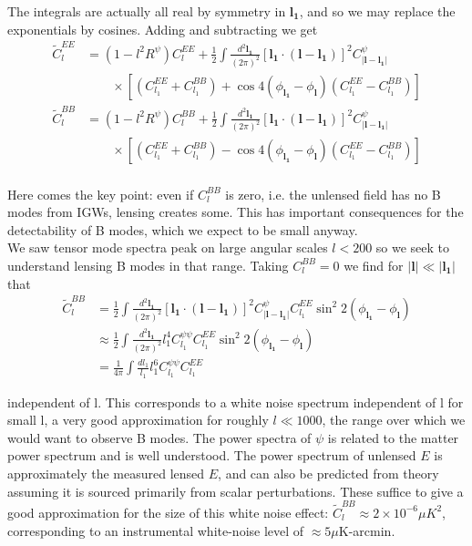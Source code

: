 \documentclass[a4paper,10pt]{article}
\renewcommand{\v}[1]{\mathbf{#1}}
\newcommand{\half}{\frac{1}{2}}
\newcommand{\finttwo}[1]{\int \frac{d^2 \v{#1}}{(2\pi)^2}}
\begin{document}
The integrals are actually all real by symmetry in $\v{l_1}$, and so we may replace the exponentials by cosines. Adding and subtracting we get
\begin{equation}\begin{split}
\tilde{C}_l^{EE} &= (1-l^2R^\psi)C_l^{EE}+\half \finttwo{l_1}[ \v{l_1}\cdot(\v{l}-\v{l_1})]^2 C^\psi_{|\v{l}-\v{l_1}|}\\
&\qquad \times [(C_{l_1}^{EE}+C_{l_1}^{BB})+\cos{4(\phi_\v{l_1}-\phi_\v{l})}(C_{l_1}^{EE}-C_{l_1}^{BB})]\\
\tilde{C}_l^{BB} &= (1-l^2R^\psi)C_l^{BB}+\half \finttwo{l_1}[ \v{l_1}\cdot(\v{l}-\v{l_1})]^2 C^\psi_{|\v{l}-\v{l_1}|}\\
&\qquad \times [(C_{l_1}^{EE}+C_{l_1}^{BB})-\cos{4(\phi_\v{l_1}-\phi_\v{l})}(C_{l_1}^{EE}-C_{l_1}^{BB})]\\
\label{lensedBmodes}
\end{split}\end{equation}

Here comes the key point: even if $C_{l}^{BB}$ is zero, i.e. the unlensed field has no B modes from IGWs, lensing creates some. This has important consequences for the detectability of B modes, which we expect to be small anyway.\\

We saw tensor mode spectra peak on large angular scales $l<200$ so we seek to understand lensing B modes in that range. Taking $C_l^{BB}=0$ we find for $|\v{l}| \ll |\v{l_1}|$ that 
\begin{equation}\begin{split}
\tilde{C}_l^{BB} &= \half \finttwo{l_1}[ \v{l_1}\cdot(\v{l}-\v{l_1})]^2 C^\psi_{|\v{l}-\v{l_1}|}C_{l_1}^{EE}\sin^2{2(\phi_\v{l_1}-\phi_\v{l})}\\
&\approx \half\finttwo{l_1} l_1^4C^{\psi\psi}_{l_1}C^{EE}_{l_1}\sin^2{2(\phi_\v{l_1}-\phi_\v{l})}\\
&=\frac{1}{4\pi}\int \frac{dl_1}{l_1}l_1^6C^{\psi\psi}_{l_1}C^{EE}_{l_1}
\end{split}\end{equation}

independent of l. This corresponds to a white noise spectrum independent of l for small l, a very good approximation for roughly $l\ll 1000$, the range over which we would want to observe B modes. The power spectra of $\psi$ is related to the matter power spectrum and is well understood. The power spectrum of unlensed $E$ is approximately the measured lensed $E$, and can also be predicted from theory assuming it is sourced primarily from scalar perturbations. These suffice to give a good approximation for the size of this white noise effect: $\tilde{C}_l^{BB} \approx 2\times10^{-6}\mu K^2$, corresponding to an instrumental white-noise level of $\approx 5\mu$K-arcmin.\\
\end{document}
